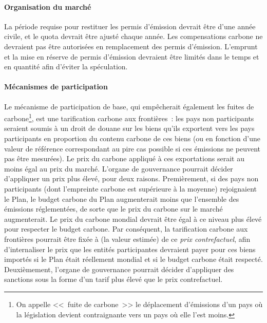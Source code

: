\documentclass[a5paper,french,openany]{memoir}
\begin{document}
\paragraph{Organisation du marché} 
La période requise pour restituer les permis d'émission devrait être d'une année civile, et le quota devrait être ajusté chaque année. Les compensations carbone ne devraient pas être autorisées en remplacement des permis d'émission. L'emprunt et la mise en réserve de permis d'émission devraient être limités dans le temps et en quantité afin d'éviter la spéculation. %

\paragraph{Mécanismes de participation}

Le mécanisme de participation de base, qui empêcherait également les fuites de carbone\footnote{On appelle <<~fuite de carbone~>> le déplacement d'émissions d'un pays où la législation devient contraignante vers un pays où elle l'est moins.}, est une tarification carbone aux frontières~: les pays non participants seraient soumis à un droit de douane sur les biens qu'ils exportent vers les pays participants en proportion du contenu carbone de ces biens (ou en fonction d'une valeur de référence correspondant au pire cas possible si ces émissions ne peuvent pas être mesurées). Le prix du carbone appliqué à ces exportations serait au moins égal au prix du marché. L'organe de gouvernance pourrait décider d'appliquer un prix plus élevé, pour deux raisons. Premièrement, si des pays non participants (dont l'empreinte carbone est supérieure à la moyenne) rejoignaient le Plan, le budget carbone du Plan augmenterait moins que l'ensemble des émissions réglementées, de sorte que le prix du carbone sur le marché augmenterait. Le prix du carbone mondial devrait être égal à ce niveau plus élevé pour respecter le budget carbone. Par conséquent, la tarification carbone aux frontières pourrait être fixée à (la valeur estimée) de ce \textit{prix contrefactuel}, afin d'internaliser le prix que les entités participantes devraient payer pour ces biens importés si le Plan était réellement mondial et si le budget carbone était respecté. Deuxièmement, l'organe de gouvernance pourrait décider d'appliquer des sanctions sous la forme d'un tarif plus élevé que le prix contrefactuel. 
\end{document}
